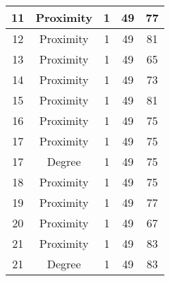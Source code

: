 \documentclass[results.tex]{subfiles}
\begin{document}
\begin{center}
\begin{tabular}{| c || c | c | c | c |}
            \hline
            11                      & Proximity                    & 1                      & 49                      & 77                   \\
            \hline
            12                      & Proximity                    & 1                      & 49                      & 81                   \\
            \hline
            13                      & Proximity                    & 1                      & 49                      & 65                   \\
            \hline
            14                      & Proximity                    & 1                      & 49                      & 73                   \\
            \hline
            15                      & Proximity                    & 1                      & 49                      & 81                   \\
            \hline
            16                      & Proximity                    & 1                      & 49                      & 75                   \\
            \hline
            17                      & Proximity                    & 1                      & 49                      & 75                   \\
            \hline
            17                      & Degree                       & 1                      & 49                      & 75                   \\
            \hline
            18                      & Proximity                    & 1                      & 49                      & 75                   \\
            \hline
            19                      & Proximity                    & 1                      & 49                      & 77                   \\
            \hline
            20                      & Proximity                    & 1                      & 49                      & 67                   \\
            \hline
            21                      & Proximity                    & 1                      & 49                      & 83                   \\
            \hline
            21                      & Degree                       & 1                      & 49                      & 83                   \\

\end{tabular}
\end{center}
\end{document}
